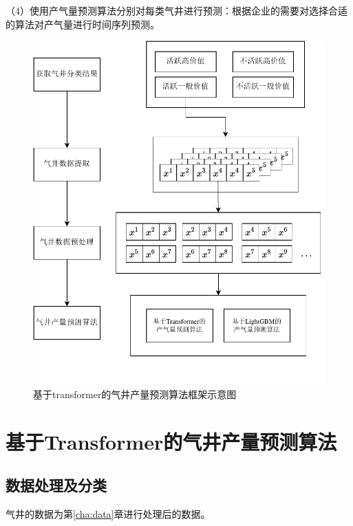 （4）使用产气量预测算法分别对每类气井进行预测：根据企业的需要对选择合适的算法对产气量进行时间序列预测。
\begin{figure}[h]
    \centering
    \includegraphics{figure/第四章框架图.vision.pdf}
    \caption{基于transformer的气井产量预测算法框架示意图}
    \label{fig:TFTprogess}
\end{figure}

\section{基于Transformer的气井产量预测算法}

\subsection{数据处理及分类}
\label{sec:datafoc}
气井的数据为第\ref{cha:data}章进行处理后的数据。


